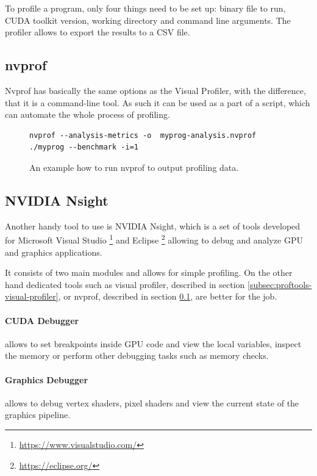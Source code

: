 To profile a program, only four things need to be set up: binary file to run, CUDA toolkit version, working directory and command line arguments. The profiler allows to export the results to a CSV file.

\subsection{nvprof}\label{subsec:proftools-nvprof}

Nvprof has basically the same options as the Visual Profiler, with the difference, that it is a command-line tool. As such it can be used as a part of a script, which can automate the whole process of profiling.

\begin{figure}
\begin{verbatim}
nvprof --analysis-metrics -o  myprog-analysis.nvprof ./myprog --benchmark -i=1
\end{verbatim}
\caption{An example how to run nvprof to output profiling data.}
\end{figure}

\subsection{NVIDIA Nsight}\label{subsec:proftools-nsight}

Another handy tool to use is NVIDIA Nsight, which is a set of tools developed for Microsoft Visual Studio \footnote{\url{https://www.visualstudio.com/}} and Eclipse \footnote{\url{https://eclipse.org/}} allowing to debug and analyze GPU and graphics applications.

It consists of two main modules and allows for simple profiling. On the other hand dedicated tools such as visual profiler, described in section \ref{subsec:proftools-visual-profiler}, or nvprof, described in section \ref{subsec:proftools-nvprof}, are better for the job.

\paragraph{CUDA Debugger} allows to set breakpoints inside GPU code and view the local variables, inspect the memory or perform other debugging tasks such as memory checks.

\paragraph{Graphics Debugger} allows to debug vertex shaders, pixel shaders and view the current state of the graphics pipeline.

